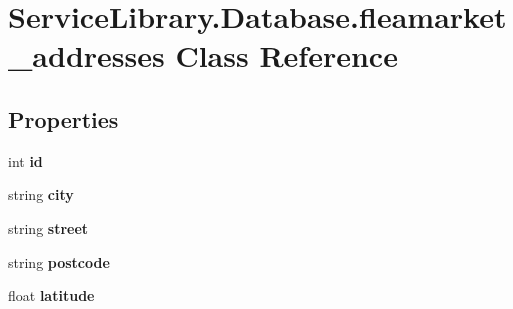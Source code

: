 \hypertarget{class_service_library_1_1_database_1_1fleamarket__addresses}{\section{Service\-Library.\-Database.\-fleamarket\-\_\-addresses Class Reference}
\label{class_service_library_1_1_database_1_1fleamarket__addresses}
}
\subsection*{Properties}
\begin{DoxyCompactItemize}
\item 
\hypertarget{class_service_library_1_1_database_1_1fleamarket__addresses_a4da474708fde2ff8fc67fb69d79f9ffb}{int {\bfseries id}}\label{class_service_library_1_1_database_1_1fleamarket__addresses_a4da474708fde2ff8fc67fb69d79f9ffb}

\item 
\hypertarget{class_service_library_1_1_database_1_1fleamarket__addresses_ac19818b3701f6637044ed6628070e782}{string {\bfseries city}}\label{class_service_library_1_1_database_1_1fleamarket__addresses_ac19818b3701f6637044ed6628070e782}

\item 
\hypertarget{class_service_library_1_1_database_1_1fleamarket__addresses_a1fc1a22790374ec43421b742a692212f}{string {\bfseries street}}\label{class_service_library_1_1_database_1_1fleamarket__addresses_a1fc1a22790374ec43421b742a692212f}

\item 
\hypertarget{class_service_library_1_1_database_1_1fleamarket__addresses_a56ea47ce8098aa8a8cea741fe9134279}{string {\bfseries postcode}}\label{class_service_library_1_1_database_1_1fleamarket__addresses_a56ea47ce8098aa8a8cea741fe9134279}

\item 
\hypertarget{class_service_library_1_1_database_1_1fleamarket__addresses_a874d8519eb5fe9fe742e822ce834cd94}{float {\bfseries latitude}}\label{class_service_library_1_1_database_1_1fleamarket__addresses_a874d8519eb5fe9fe742e822ce834cd94}


\end{DoxyCompactItemize}
